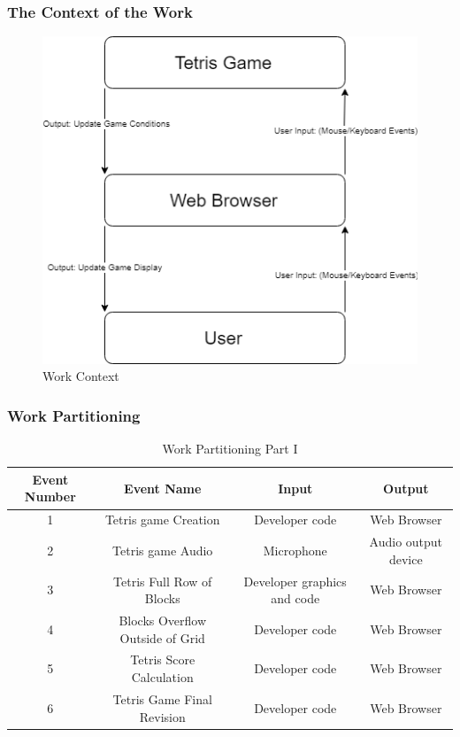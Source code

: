 \documentclass[12pt, titlepage]{article}
\begin{document}
\subsubsection{The Context of the Work}
\begin{figure}[H]
\caption{Work Context}
\centering
\includegraphics[width=0.95\linewidth]{Context.png}
\end{figure}


\subsubsection*{Work Partitioning}
\begin{table}[H]
\caption{Work Partitioning Part I}
\hskip-2.5cm\begin{tabular}{|c|c|c|c|}
\hline
Event Number & Event Name & Input & Output\\
\hline
1 & Tetris game Creation & Developer code & Web Browser\\
\hline
2 & Tetris game Audio & Microphone & Audio output device\\
\hline
3 & Tetris Full Row of Blocks & Developer graphics and code & Web Browser\\
\hline
4 & Blocks Overflow Outside of Grid & Developer code & Web Browser\\
\hline
5 & Tetris Score Calculation & Developer code & Web Browser\\
\hline
6 & Tetris Game Final Revision & Developer code & Web Browser\\
\hline
\end{tabular}
\label{default}
\end{table}%
\end{document}
